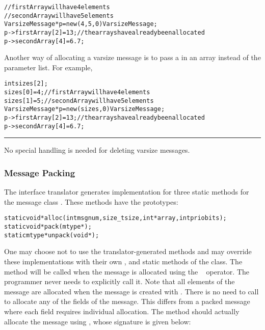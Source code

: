 \begin{alltt}
// firstArray will have 4 elements
// secondArray will have 5 elements 
VarsizeMessage* p = new(4, 5, 0) VarsizeMessage;
p->firstArray[2] = 13;     // the arrays have already been allocated 
p->secondArray[4] = 6.7; 
\end{alltt}

Another way of allocating a varsize message is to pass a  in an array
instead of the parameter list. For example,

\begin{alltt}
int sizes[2];
sizes[0] = 4;               // firstArray will have 4 elements
sizes[1] = 5;               // secondArray will have 5 elements 
VarsizeMessage* p = new(sizes, 0) VarsizeMessage;
p->firstArray[2] = 13;     // the arrays have already been allocated 
p->secondArray[4] = 6.7; 
\end{alltt}

\hrule
\normalsize

No special handling is needed for deleting varsize messages.

\subsubsection{Message Packing}

\label{message packing}

The \charmpp{} interface translator generates implementation for three static
methods for the message class . These methods have the
prototypes:

\begin{alltt}
    static void* alloc(int msgnum, size_t size, int* array, int priobits);
    static void* pack(mtype*);
    static mtype* unpack(void*);
\end{alltt}

One may choose not to use the translator-generated methods and may override
these implementations with their own ,  and 
static methods of the  class.  The  method will be called
when the message is allocated using the \CC\  operator. The programmer
never needs to explicitly call it.  Note that all elements of the message are
allocated when the message is created with . There is no need to call
 to allocate any of the fields of the message. This differs from a
packed message where each field requires individual allocation. The 
method should actually allocate the message using , whose
signature is given below:

